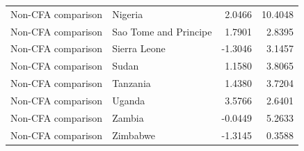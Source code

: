 \begin{table}
\begin{tabular}[t]{llrr}
Non-CFA comparison & Nigeria & 2.0466 & 10.4048\\
Non-CFA comparison & Sao Tome and Principe & 1.7901 & 2.8395\\
Non-CFA comparison & Sierra Leone & -1.3046 & 3.1457\\
\addlinespace
Non-CFA comparison & Sudan & 1.1580 & 3.8065\\
Non-CFA comparison & Tanzania & 1.4380 & 3.7204\\
Non-CFA comparison & Uganda & 3.5766 & 2.6401\\
Non-CFA comparison & Zambia & -0.0449 & 5.2633\\
Non-CFA comparison & Zimbabwe & -1.3145 & 0.3588\\
\bottomrule
\end{tabular}
\end{table}